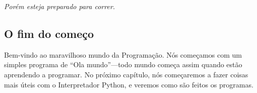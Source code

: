 \noindent
\emph{Porém esteja preparado para correr.}

\subsection*{\color{BrickRed}O fim do começo}

Bem-vindo ao maravilhoso mundo da Programação. Nós começamos com um simples programa de ``Ola mundo''---todo mundo começa assim quando estão aprendendo a programar.
No próximo capítulo, nós começaremos a fazer coisas mais úteis com o Interpretador Python, e veremos como são feitos os programas.

\newpage

